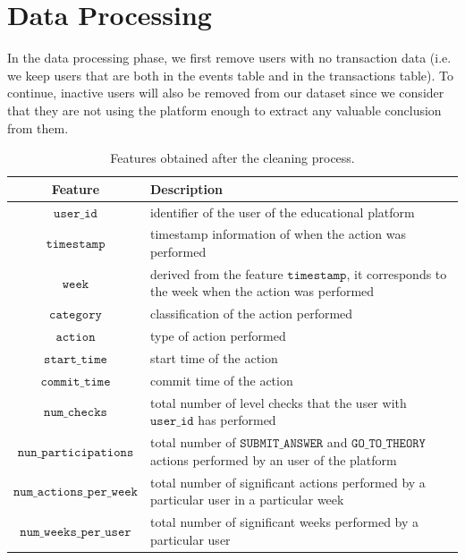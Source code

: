 \documentclass[sigplan,screen]{acmart}
\begin{document}
\section{Data Processing} \label{data:cleaning}


In the data processing phase, we first remove users with no transaction data (i.e. we keep users that are both in the events table and in the transactions table). To continue, inactive users will also be removed from our dataset since we consider that they are not using the platform enough to extract any valuable conclusion from them.

\begin{table}[h]
  \caption{Features obtained after the cleaning process.}
  \label{tab:features}
  \begin{tabular}{cl}
    \toprule
    \textbf{Feature}&\textbf{Description}\\
    \midrule
    $\texttt{user\_id}$ & identifier of the user of the educational platform \\
    $\texttt{timestamp}$ & timestamp information of when the action was performed \\
    $\texttt{week}$ & derived from the feature $\texttt{timestamp}$, it corresponds to the week when the action was performed \\
    $\texttt{category}$ & classification of the action performed \\
    $\texttt{action}$ & type of action performed \\
    $\texttt{start\_time}$ & start time of the action \\
    $\texttt{commit\_time}$ & commit time of the action \\
    $\texttt{num\_checks}$ & total number of level checks that the user with $\texttt{user\_id}$ has performed \\
    $\texttt{nun\_participations}$ & total number of $\texttt{SUBMIT\_ANSWER}$ and $\texttt{GO\_TO\_THEORY}$ actions performed by an user of the platform \\
    $\texttt{num\_actions\_per\_week}$ & total number of significant actions performed by a particular user in a particular week \\
    $\texttt{num\_weeks\_per\_user}$ & total number of significant weeks performed by a particular user \\
    \bottomrule
    \end{tabular}
\end{table}
\end{document}
